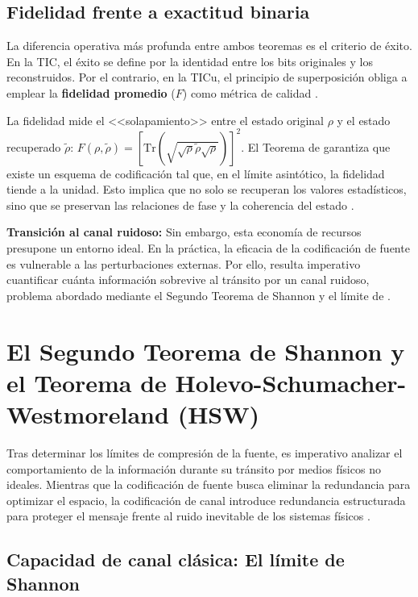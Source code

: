 \documentclass[11pt,a4paper,spanish]{book}
\begin{document}
\subsection{Fidelidad frente a exactitud binaria}

La diferencia operativa más profunda entre ambos teoremas es el criterio de éxito. En la TIC, el éxito se define por la identidad entre los bits originales y los reconstruidos. Por el contrario, en la TICu, el principio de superposición obliga a emplear la \textbf{fidelidad promedio} ($F$) como métrica de calidad \citep{jozsa1994}. 

La fidelidad mide el <<solapamiento>> entre el estado original $\rho$ y el estado recuperado $\tilde{\rho}$: $F(\rho, \tilde{\rho}) = [\text{Tr}(\sqrt{\sqrt{\rho}\tilde{\rho}\sqrt{\rho}})]^2$. El Teorema de \citet{schumacher1995} garantiza que existe un esquema de codificación tal que, en el límite asintótico, la fidelidad tiende a la unidad. Esto implica que no solo se recuperan los valores estadísticos, sino que se preservan las relaciones de fase y la coherencia del estado \citep{nielsen2010}.

\textbf{Transición al canal ruidoso:} Sin embargo, esta economía de recursos presupone un entorno ideal. En la práctica, la eficacia de la codificación de fuente es vulnerable a las perturbaciones externas. Por ello, resulta imperativo cuantificar cuánta información sobrevive al tránsito por un canal ruidoso, problema abordado mediante el Segundo Teorema de Shannon \citep{shannon1948} y el límite de \citet{holevo1973}.

\section{El Segundo Teorema de Shannon y el Teorema de Holevo-Schumacher-Westmoreland (HSW)}

Tras determinar los límites de compresión de la fuente, es imperativo analizar el comportamiento de la información durante su tránsito por medios físicos no ideales. Mientras que la codificación de fuente busca eliminar la redundancia para optimizar el espacio, la codificación de canal introduce redundancia estructurada para proteger el mensaje frente al ruido inevitable de los sistemas físicos \citep{shannon1948}.

\subsection{Capacidad de canal clásica: El límite de Shannon}
\end{document}

